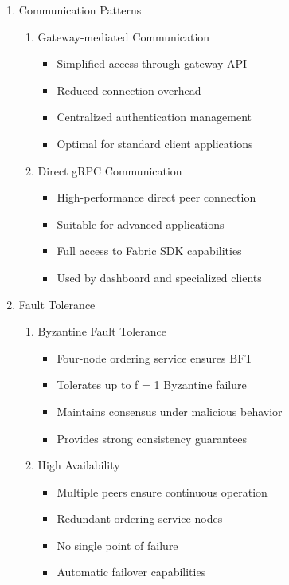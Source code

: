 \documentclass[conference]{IEEEtran}
\begin{document}
\begin{enumerate}[itemsep=2ex, parsep=1ex]
	\item{Communication Patterns}
			
	\begin{enumerate}
		\item Gateway-mediated Communication
		      \begin{itemize}[itemsep=0.5pt, parsep=0.5pt]
		      	\item Simplified access through gateway API
		      	\item Reduced connection overhead
		      	\item Centralized authentication management
		      	\item Optimal for standard client applications
		      \end{itemize}
		      		      		      
		\item Direct gRPC Communication
		      \begin{itemize}[itemsep=0.5pt, parsep=0.5pt]
		      	\item High-performance direct peer connection
		      	\item Suitable for advanced applications
		      	\item Full access to Fabric SDK capabilities
		      	\item Used by dashboard and specialized clients
		      \end{itemize}
	\end{enumerate}
			
	\item{Fault Tolerance}
			
	\begin{enumerate}
		\item Byzantine Fault Tolerance
		      \begin{itemize}[itemsep=0.5pt, parsep=0.5pt]
		      	\item Four-node ordering service ensures BFT
		      	\item Tolerates up to f = 1 Byzantine failure
		      	\item Maintains consensus under malicious behavior
		      	\item Provides strong consistency guarantees
		      \end{itemize}
		      		      		      
		\item High Availability
		      \begin{itemize}[itemsep=0.5pt, parsep=0.5pt]
		      	\item Multiple peers ensure continuous operation
		      	\item Redundant ordering service nodes
		      	\item No single point of failure
		      	\item Automatic failover capabilities
		      \end{itemize}
	\end{enumerate}
\end{enumerate}
\end{document}
